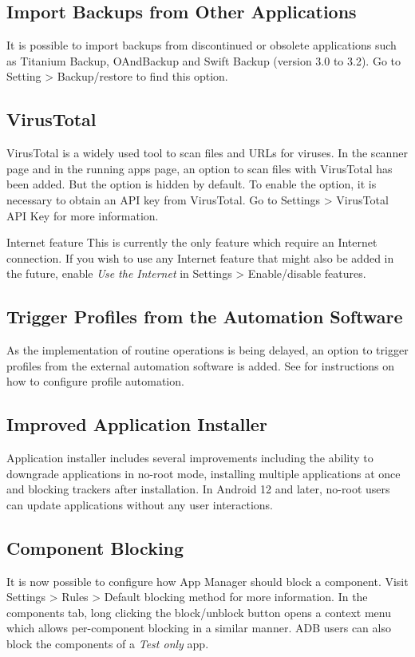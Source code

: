 \subsection{Import Backups from Other Applications}
It is possible to import backups from discontinued or obsolete applications such as Titanium Backup, OAndBackup and Swift Backup (version 3.0 to 3.2).
Go to Setting > Backup/restore to find this option.

\subsection{VirusTotal}
VirusTotal is a widely used tool to scan files and URLs for viruses. In the scanner page and in the running apps page, an option to scan files with VirusTotal has been added.
But the option is hidden by default. To enable the option, it is necessary to obtain an API key from VirusTotal. Go to Settings > VirusTotal API Key for more information.

\begin{warning}{Internet feature}
    This is currently the only feature which require an Internet connection. If you wish to use any Internet feature that might also be added in the future,
    enable \textit{Use the Internet} in Settings > Enable/disable features.
\end{warning}

\subsection{Trigger Profiles from the Automation Software}
As the implementation of routine operations is being delayed, an option to trigger profiles from the external automation software is added.
See  for instructions on how to configure profile automation.

\subsection{Improved Application Installer}
Application installer includes several improvements including the ability to downgrade applications in no-root mode, installing multiple applications at once and blocking trackers after installation.
In Android 12 and later, no-root users can update applications without any user interactions.

\subsection{Component Blocking}
It is now possible to configure how App Manager should block a component. Visit Settings > Rules > Default blocking method for more information.
In the components tab, long clicking the block/unblock button opens a context menu which allows per-component blocking in a similar manner.
ADB users can also block the components of a \textit{Test only} app.

